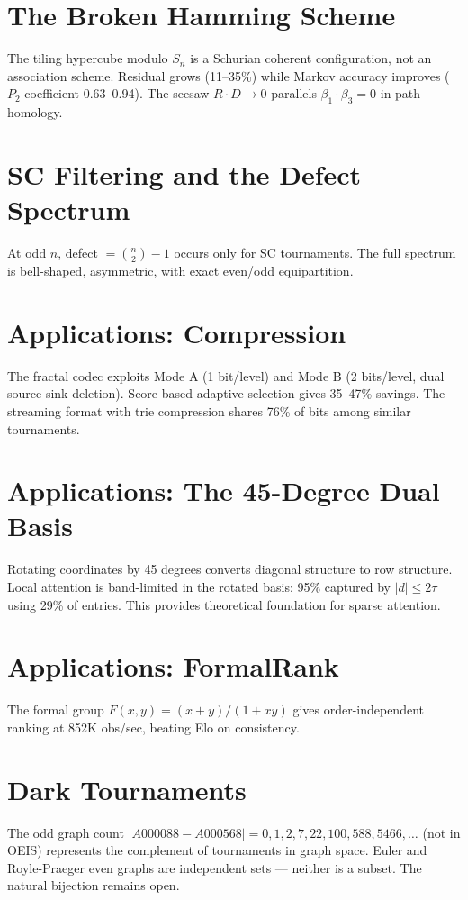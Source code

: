 \documentclass[12pt,reqno]{amsart}
\theoremstyle{plain}
\theoremstyle{definition}
\theoremstyle{remark}
\begin{document}
\section{The Broken Hamming Scheme}
The tiling hypercube modulo \(S_n\) is a Schurian coherent configuration, not an association scheme. Residual grows (11--35\%) while Markov accuracy improves (\(P_2\) coefficient 0.63--0.94). The seesaw \(R \cdot D \to 0\) parallels \(\beta_1 \cdot \beta_3 = 0\) in path homology.

\section{SC Filtering and the Defect Spectrum}
At odd \(n\), defect \(= \binom{n}{2}-1\) occurs only for SC tournaments. The full spectrum is bell-shaped, asymmetric, with exact even/odd equipartition.

\section{Applications: Compression}
The fractal codec exploits Mode A (1 bit/level) and Mode B (2 bits/level, dual source-sink deletion). Score-based adaptive selection gives 35--47\% savings. The streaming format with trie compression shares 76\% of bits among similar tournaments.

\section{Applications: The 45-Degree Dual Basis}
Rotating coordinates by 45 degrees converts diagonal structure to row structure. Local attention is band-limited in the rotated basis: 95\% captured by \(|d| \leq 2\tau\) using 29\% of entries. This provides theoretical foundation for sparse attention.

\section{Applications: FormalRank}
The formal group \(F(x,y) = (x+y)/(1+xy)\) gives order-independent ranking at 852K obs/sec, beating Elo on consistency.

\section{Dark Tournaments}
The odd graph count \(|A000088 - A000568| = 0,1,2,7,22,100,588,5466,\ldots\) (not in OEIS) represents the complement of tournaments in graph space. Euler and Royle-Praeger even graphs are independent sets --- neither is a subset. The natural bijection remains open.
\end{document}

